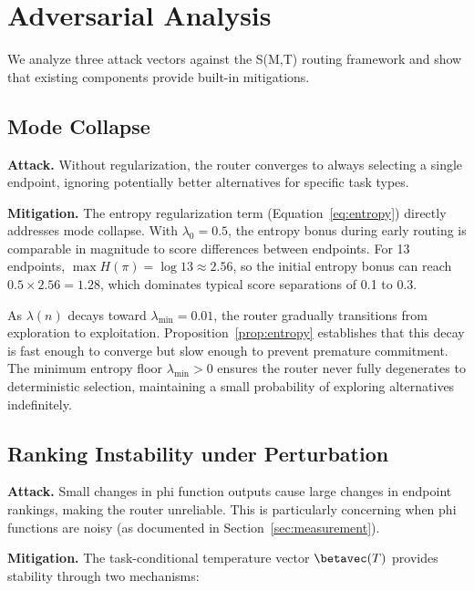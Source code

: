 \section{Adversarial Analysis}
\label{sec:app_adversarial}

We analyze three attack vectors against the S(M,T) routing framework and show that existing components provide built-in mitigations.

\subsection{Mode Collapse}

\textbf{Attack.} Without regularization, the router converges to always selecting a single endpoint, ignoring potentially better alternatives for specific task types.

\textbf{Mitigation.} The entropy regularization term (Equation~\ref{eq:entropy}) directly addresses mode collapse. With $\lambda_0 = 0.5$, the entropy bonus during early routing is comparable in magnitude to score differences between endpoints. For 13 endpoints, $\max H(\pi) = \log 13 \approx 2.56$, so the initial entropy bonus can reach $0.5 \times 2.56 = 1.28$, which dominates typical score separations of 0.1 to 0.3.

As $\lambda(n)$ decays toward $\lambda_{\min} = 0.01$, the router gradually transitions from exploration to exploitation. Proposition~\ref{prop:entropy} establishes that this decay is fast enough to converge but slow enough to prevent premature commitment. The minimum entropy floor $\lambda_{\min} > 0$ ensures the router never fully degenerates to deterministic selection, maintaining a small probability of exploring alternatives indefinitely.

\subsection{Ranking Instability under Perturbation}

\textbf{Attack.} Small changes in phi function outputs cause large changes in endpoint rankings, making the router unreliable. This is particularly concerning when phi functions are noisy (as documented in Section~\ref{sec:measurement}).

\textbf{Mitigation.} The task-conditional temperature vector $\betavec(T)$ provides stability through two mechanisms:

